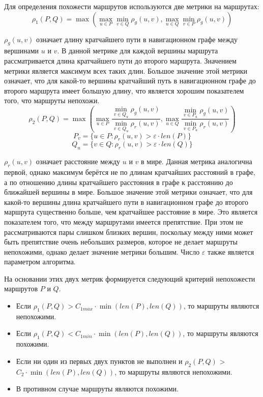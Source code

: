 Для определения похожести маршрутов используются две метрики на
маршрутах:
\begin{equation*}
    \rho_1 (P, Q) = \max(\max_{u \in P} \min_{v \in Q} \rho_g(u,
    v), \max_{u \in Q} \min_{v \in P} \rho_g(u, v))
\end{equation*}

$\rho_g(u, v)$ означает длину кратчайшего пути в навигационном графе
между вершинами $u$ и $v$. В данной метрике для каждой вершины
маршрута рассматривается длина кратчайшего пути до второго маршрута.
Значением метрики является максимум всех таких длин. Большое значение
этой метрики означает, что для какой-то вершины кратчайший путь в
навигационном графе до второго маршрута имеет большую длину, что
является хорошим показателем того, что маршруты непохожи.
\begin{equation*}
    \rho_2 (P, Q) = \max(\max_{u \in P} \frac{\min\limits_{v \in Q_u}
    \rho_g(u, v)}{\min\limits_{v \in Q_u} \rho_r(u, v)}, \max\limits_{u \in Q} \frac{\min\limits_{v \in P_u}
    \rho_g(u, v)}{\min\limits_{v \in P_u} \rho_r(u, v)})
\end{equation*}
\begin{equation*}
    P_v = \{ u \in P : \rho_r(u, v) > \varepsilon \cdot len(P) \}
\end{equation*}
\begin{equation*}
    Q_u = \{ v \in Q : \rho_r(u, v) > \varepsilon \cdot len(Q) \}
\end{equation*}

$\rho_r(u, v)$ означает расстояние между $u$ и $v$ в мире. Данная
метрика аналогична первой, однако максимум берётся не по длинам
кратчайших расстояний в графе, а по отношению длины кратчайшего
расстояния в графе к расстоянию до ближайшей вершины в мире. Большое
значение этой метрики означает, что для какой-то вершины длина кратчайшего
пути в навигационном графе до второго маршрута существенно больше, чем
кратчайшее расстояние в мире. Это является показателем того, что между
маршрутами имеется препятствие. При этом не рассматриваются пары
слишком близких вершин, поскольку между ними может быть препятствие
очень небольших размеров, которое не делает маршруты непохожими,
однако делает значение метрики большим. Число $\varepsilon$ также
является параметром алгоритма.

На основании этих двух метрик формируется следующий критерий
непохожести маршрутов $P$ и $Q$.
\begin{itemize}
  \item Если $\rho_1(P, Q) > C_{1max} \cdot \min(len(P), len(Q))$, то
    маршруты являются непохожими.
  \item Если $\rho_1(P, Q) < C_{1min} \cdot \min(len(P), len(Q))$, то
    маршруты являются похожими.
  \item Если ни один из первых двух пунктов не выполнен и $\rho_2(P,
    Q)$ > $C_2 \cdot \min(len(P), len(Q))$, то маршруты являются непохожими.

  \item В противном случае маршруты являются похожими.
\end{itemize}

